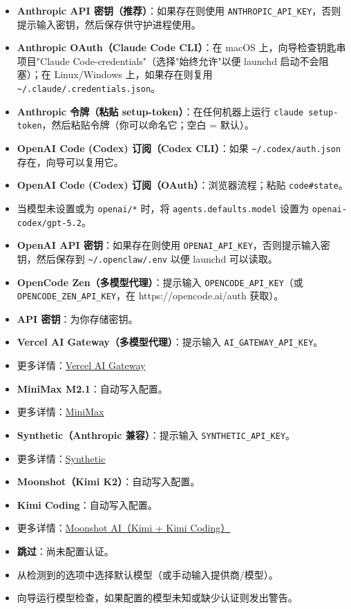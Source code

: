 \begin{itemize}
  \item \textbf{Anthropic API 密钥（推荐）}：如果存在则使用 \texttt{ANTHROPIC\_API\_KEY}，否则提示输入密钥，然后保存供守护进程使用。
  \item \textbf{Anthropic OAuth（Claude Code CLI）}：在 macOS 上，向导检查钥匙串项目"Claude Code-credentials"（选择"始终允许"以便 launchd 启动不会阻塞）；在 Linux/Windows 上，如果存在则复用 \texttt{\textasciitilde{}/.claude/.credentials.json}。
  \item \textbf{Anthropic 令牌（粘贴 setup-token）}：在任何机器上运行 \texttt{claude setup-token}，然后粘贴令牌（你可以命名它；空白 = 默认）。
  \item \textbf{OpenAI Code (Codex) 订阅（Codex CLI）}：如果 \texttt{\textasciitilde{}/.codex/auth.json} 存在，向导可以复用它。
  \item \textbf{OpenAI Code (Codex) 订阅（OAuth）}：浏览器流程；粘贴 \texttt{code\#state}。
  \item 当模型未设置或为 \texttt{openai/*} 时，将 \texttt{agents.defaults.model} 设置为 \texttt{openai-codex/gpt-5.2}。
  \item \textbf{OpenAI API 密钥}：如果存在则使用 \texttt{OPENAI\_API\_KEY}，否则提示输入密钥，然后保存到 \texttt{\textasciitilde{}/.openclaw/.env} 以便 launchd 可以读取。
  \item \textbf{OpenCode Zen（多模型代理）}：提示输入 \texttt{OPENCODE\_API\_KEY}（或 \texttt{OPENCODE\_ZEN\_API\_KEY}，在 https://opencode.ai/auth 获取）。
  \item \textbf{API 密钥}：为你存储密钥。
  \item \textbf{Vercel AI Gateway（多模型代理）}：提示输入 \texttt{AI\_GATEWAY\_API\_KEY}。
  \item 更多详情：\href{/providers/vercel-ai-gateway}{Vercel AI Gateway}
  \item \textbf{MiniMax M2.1}：自动写入配置。
  \item 更多详情：\href{/providers/minimax}{MiniMax}
  \item \textbf{Synthetic（Anthropic 兼容）}：提示输入 \texttt{SYNTHETIC\_API\_KEY}。
  \item 更多详情：\href{/providers/synthetic}{Synthetic}
  \item \textbf{Moonshot（Kimi K2）}：自动写入配置。
  \item \textbf{Kimi Coding}：自动写入配置。
  \item 更多详情：\href{/providers/moonshot}{Moonshot AI（Kimi + Kimi Coding）}
  \item \textbf{跳过}：尚未配置认证。
  \item 从检测到的选项中选择默认模型（或手动输入提供商/模型）。
  \item 向导运行模型检查，如果配置的模型未知或缺少认证则发出警告。
\end{itemize}


